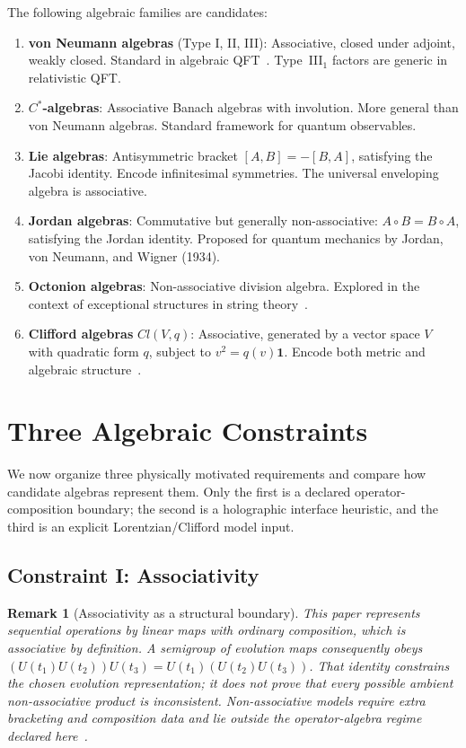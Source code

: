 \documentclass[12pt,a4paper,openany]{book}
\newtheorem{remark}[theorem]{Remark}
\begin{document}
The following algebraic families are candidates:

\begin{enumerate}
\item \textbf{von Neumann algebras} (Type I, II, III): Associative, closed under adjoint, weakly closed. Standard in algebraic QFT~\cite{Haag1996}. Type~III$_1$ factors are generic in relativistic QFT.
\item \textbf{$C^*$-algebras}: Associative Banach algebras with involution. More general than von Neumann algebras. Standard framework for quantum observables.
\item \textbf{Lie algebras}: Antisymmetric bracket $[A,B] = -[B,A]$, satisfying the Jacobi identity. Encode infinitesimal symmetries. The universal enveloping algebra is associative.
\item \textbf{Jordan algebras}: Commutative but generally non-associative: $A \circ B = B \circ A$, satisfying the Jordan identity. Proposed for quantum mechanics by Jordan, von Neumann, and Wigner (1934).
\item \textbf{Octonion algebras}: Non-associative division algebra. Explored in the context of exceptional structures in string theory~\cite{Gunaydin1973}.
\item \textbf{Clifford algebras} $Cl(V,q)$: Associative, generated by a vector space $V$ with quadratic form $q$, subject to $v^2 = q(v)\mathbf{1}$. Encode both metric and algebraic structure~\cite{Hestenes1966,Doran2003}.
\end{enumerate}

\section{Three Algebraic Constraints}
\label{A-sec:constraints}

We now organize three physically motivated requirements and compare how candidate algebras represent them.  Only the first is a declared operator-composition boundary; the second is a holographic interface heuristic, and the third is an explicit Lorentzian/Clifford model input.

\subsection{Constraint I: Associativity}

\begin{remark}[Associativity as a structural boundary]
\label{A-rem:assoc-boundary}
This paper represents sequential operations by linear maps with ordinary composition, which is associative by definition.  A semigroup of evolution maps consequently obeys
$(U(t_1)U(t_2))U(t_3)=U(t_1)(U(t_2)U(t_3))$.
That identity constrains the chosen evolution representation; it does not prove that every possible ambient non-associative product is inconsistent.  Non-associative models require extra bracketing and composition data and lie outside the operator-algebra regime declared here~\cite{Schafer1966,Gunaydin1973}.
\end{remark}
\end{document}
